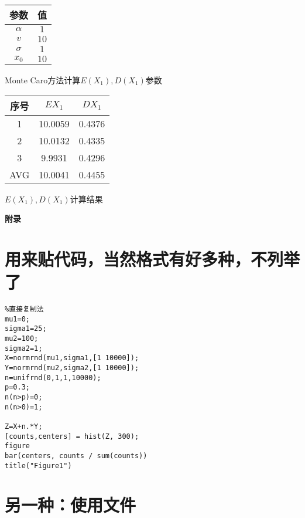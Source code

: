 \documentclass[UTF8]{ctexart}
\begin{document}
  \begin{minipage}{\textwidth}

    \begin{minipage}[t]{0.48\textwidth}
        \centering
    \makeatletter{}
    \begin{tabular}{cc}
        \toprule
        参数&值\\
        \hline
        $\alpha$& $ 1$\\
        $v   $  &$   10$   \\
        $\sigma$  &$  1 $   \\
        $x_0   $  &$ 10  $   \\
        \bottomrule
    \end{tabular}
    \caption{Monte Caro方法计算$E(X_1),D(X_1)$参数}
    \label{tab:q2}
    \end{minipage}
    \begin{minipage}[t]{0.48\textwidth}
        \centering
    \makeatletter{}
    \begin{tabular}{ccc}
        \toprule
        序号&$EX_1$&$DX_1$\\
        \hline
       1&10.0059  &  0.4376\\
        2&10.0132  &  0.4335\\
        3&9.9931    &0.4296\\
        \hline
        AVG&10.0041&0.4455\\
        \bottomrule
    \end{tabular}
    \caption{$E(X_1),D(X_1)$计算结果}
    \label{tab:q2-2}
    \end{minipage}
    \end{minipage}

\newpage
\appendix
\textbf{附录}

\section{用来贴代码，当然格式有好多种，不列举了}
\begin{lstlisting}
%直接复制法
mu1=0;
sigma1=25;
mu2=100;
sigma2=1;
X=normrnd(mu1,sigma1,[1 10000]);
Y=normrnd(mu2,sigma2,[1 10000]);
n=unifrnd(0,1,1,10000);
p=0.3;
n(n>p)=0;
n(n>0)=1;

Z=X+n.*Y;
[counts,centers] = hist(Z, 300);
figure
bar(centers, counts / sum(counts))
title("Figure1")
\end{lstlisting}
\section{另一种：使用文件}

\end{document}
